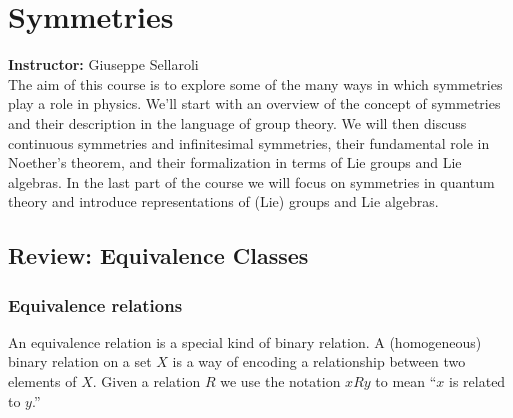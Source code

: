 \documentclass{book}
\theoremstyle{definition}
\begin{document}
\newpage









































\chapter{Symmetries}

\textbf{Instructor:} Giuseppe Sellaroli\\

The aim of this course is to  explore some of the many ways in which symmetries play a role in physics. We'll start with an overview of the concept of symmetries and their description in the language of  group theory. We will then discuss continuous symmetries and infinitesimal symmetries, their fundamental role in Noether's theorem, and their formalization in terms of Lie groups and Lie algebras. In the last part of the course we will focus on symmetries in quantum theory and introduce representations of (Lie) groups and Lie algebras.


\newpage


\section{Review: Equivalence Classes}


\subsection{Equivalence relations}


An equivalence relation is a special kind of binary relation. A
(homogeneous) binary relation on a set $X$ is a way of encoding a relationship between two elements of $X$. Given a relation $R$ we use the notation $xRy$ to mean ``$x$ is related to $y$.'' \\
\end{document}
